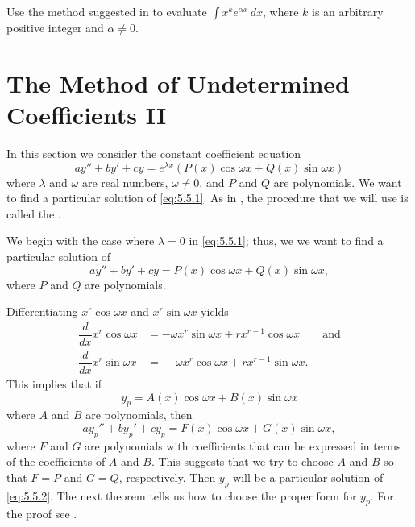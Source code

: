 \begin{exerciselist}
\item\label{exer:5.4.40}Use the method suggested in  to
evaluate $\int x^ke^{\alpha x}\,dx$, where $k$ is an arbitrary
positive integer and $\alpha\ne0$.
\end{exerciselist}


\section{The Method of Undetermined Coefficients II}\label{sec:undetermined_coeffs_ii}

In this section we consider the constant coefficient equation
\begin{equation} \label{eq:5.5.1}
ay''+by'+cy=e^{\lambda x}\left(P(x)\cos \omega x+Q(x)\sin \omega x\right)
\end{equation}
where $\lambda$ and $\omega$ are real numbers, $\omega\ne0$, and $P$
and $Q$ are polynomials. We want to find a particular solution of
\eqref{eq:5.5.1}. As in , the procedure that we
will use is called the .



We begin with the case where $\lambda=0$ in \eqref{eq:5.5.1};   thus, we
we
want to find a particular solution of
\begin{equation} \label{eq:5.5.2}
ay''+by'+cy=P(x)\cos\omega x+Q(x)\sin\omega x,
\end{equation}
where $P$ and $Q$ are polynomials.

Differentiating  $x^r\cos\omega x$ and $x^r\sin\omega x$ yields
\begin{align*}
\dfrac{d}{dx}x^r\cos\omega x
&=-\omega x^r\sin\omega x+rx^{r-1}\cos\omega x\qquad\text{and} \\
\dfrac{d}{dx}x^r\sin\omega x
&=\phantom{-}\omega x^r\cos\omega x+rx^{r-1}\sin\omega x.
\end{align*}
This implies  that if
\[
y_p=A(x)\cos\omega x+B(x)\sin\omega x
\]
where $A$ and $B$ are polynomials, then
\[
ay_p''+by_p'+cy_p=F(x)\cos\omega x+G(x)\sin\omega x,
\]
where $F$ and $G$ are polynomials with coefficients that can be
expressed in terms of the coefficients of $A$ and $B$. This suggests
that we try to choose $A$ and $B$ so that $F=P$ and $G=Q$,
respectively. Then $y_p$ will be a particular solution of
\eqref{eq:5.5.2}. The next theorem tells us how to choose the proper
form for $y_p$. For the proof see .


